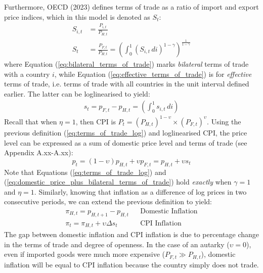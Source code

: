 Furthermore, OECD (2023) defines terms of trade as a ratio of import and export price indices, which in this model is denoted as $S_t$:
\begin{align}
    S_{i,t} &= \frac{P_{i,t}}{P_{H,t}}                       \label{eq:bilateral_terms_of_trade}                                                                                    \\
    S_{t} &=  \frac{P_{F,t}}{P_{H,t}} = \left(\int_{0}^{1} (S_{i,t} \, di)^{1-\gamma}\right)^{\frac{1}{1-\gamma}}            \label{eq:effective_terms_of_trade}              
\end{align}
where Equation (\ref{eq:bilateral_terms_of_trade}) marks \textit{bilateral} terms of trade with a country $i$, while Equation (\ref{eq:effective_terms_of_trade}) is for \textit{effective} terms of trade, i.e. terms of trade with all countries in the unit interval defined earlier. The latter can be loglinearised to yield:
\begin{align}
    s_t = p_{F,t} - p_{H,t} = \left(\int_{0}^{1} s_{i,t} \, di \right)                                      \label{eq:terms_of_trade_log} 
\end{align}
Recall that when $\eta = 1$, then CPI is $P_t = (P_{H,t})^{1-\upsilon} \times (P_{F,t})^{\upsilon}$. Using the previous definition (\ref{eq:terms_of_trade_log}) and loglinearised CPI, the price level can be expressed as a sum of domestic price level and terms of trade (see Appendix A.xx-A.xx):
\begin{equation}
    p_t = (1-\upsilon)p_{H,t} + \upsilon p_{F,t} = p_{H,t} + \upsilon s_t \label{eq:domestic_price_plus_bilateral_terms_of_trade}
\end{equation}
Note that Equations (\ref{eq:terms_of_trade_log}) and (\ref{eq:domestic_price_plus_bilateral_terms_of_trade}) hold \textit{exactly} when $\gamma=1$ and $\eta = 1$. Similarly, knowing that inflation as a difference of log prices in two consecutive periods, we can extend the previous definition to yield:
\begin{align}
    \pi_{H,t} = p_{H,t+1} - p_{H,t}         &  & \text{Domestic Inflation} \\
    \pi_{t} = \pi_{H,t} + \upsilon \Delta s_t \label{eq:cpi_inflation_tot}&  & \text{CPI Inflation}
\end{align}
The gap between domestic inflation and CPI inflation is due to percentage change in the terms of trade and degree of openness. In the case of an autarky ($\upsilon = 0$), even if imported goods were much more expensive ($P_{F,t} \gg P_{H,t}$), domestic inflation will be equal to CPI inflation because the country simply does not trade.

